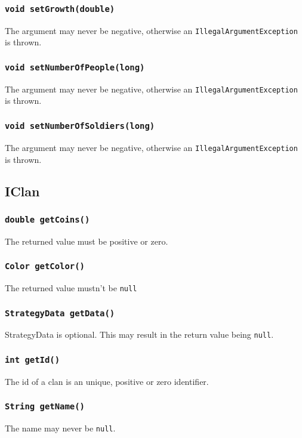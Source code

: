 \documentclass{article}
\begin{document}
\subsubsection{\texttt{void setGrowth(double)}}
The argument may never be negative, otherwise an \texttt{IllegalArgumentException} is thrown.

\subsubsection{\texttt{void setNumberOfPeople(long)}}
The argument may never be negative, otherwise an \texttt{IllegalArgumentException} is thrown.

\subsubsection{\texttt{void setNumberOfSoldiers(long)}}
The argument may never be negative, otherwise an \texttt{IllegalArgumentException} is thrown.

\subsection{IClan}

\subsubsection{\texttt{double getCoins()}}
The returned value must be positive or zero.

\subsubsection{\texttt{Color getColor()}}
The returned value mustn't be \texttt{null}

\subsubsection{\texttt{StrategyData getData()}}
StrategyData is optional. This may result in the return value being \texttt{null}.

\subsubsection{\texttt{int getId()}}
The id of a clan is an unique, positive or zero identifier.

\subsubsection{\texttt{String getName()}}
The name may never be \texttt{null}.
\end{document}
